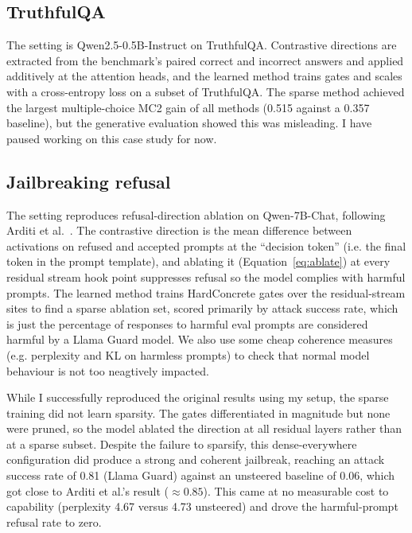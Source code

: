 \documentclass[a4paper,11pt]{article}
\begin{document}
\subsection{TruthfulQA}

The setting is Qwen2.5-0.5B-Instruct on TruthfulQA. Contrastive directions are extracted from the benchmark's paired correct and incorrect answers and applied additively at the attention heads, and the learned method trains gates and scales with a cross-entropy loss on a subset of TruthfulQA. The sparse method achieved the largest multiple-choice MC2 gain of all methods (0.515 against a 0.357 baseline), but the generative evaluation showed this was misleading. I have paused working on this case study for now.

\subsection{Jailbreaking refusal}

The setting reproduces refusal-direction ablation on Qwen-7B-Chat, following Arditi et al.~\citep{arditi2024refusal}. The contrastive direction is the mean difference between activations on refused and accepted prompts at the ``decision token'' (i.e. the final token in the prompt template), and ablating it (Equation~\ref{eq:ablate}) at every residual stream hook point suppresses refusal so the model complies with harmful prompts. The learned method trains HardConcrete gates over the residual-stream sites to find a sparse ablation set, scored primarily by attack success rate, which is just the percentage of responses to harmful eval prompts are considered harmful by a Llama Guard model. We also use some cheap coherence measures (e.g. perplexity and KL on harmless prompts) to check that normal model behaviour is not too neagtively impacted.

While I successfully reproduced the original results using my setup, the sparse training did not learn sparsity. The gates differentiated in magnitude but none were pruned, so the model ablated the direction at all residual layers rather than at a sparse subset. Despite the failure to sparsify, this dense-everywhere configuration did produce a strong and coherent jailbreak, reaching an attack success rate of 0.81 (Llama Guard) against an unsteered baseline of 0.06, which got close to Arditi et al.'s result ($\approx 0.85$). This came at no measurable cost to capability (perplexity 4.67 versus 4.73 unsteered) and drove the harmful-prompt refusal rate to zero.
\end{document}
